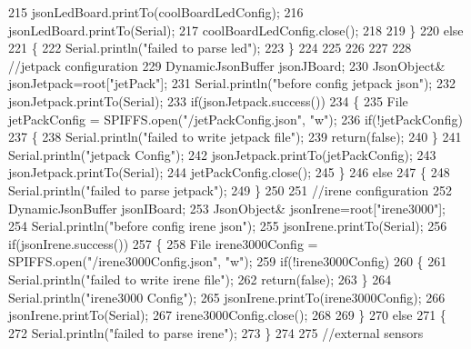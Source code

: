 \begin{DoxyCode}
215         jsonLedBoard.printTo(coolBoardLedConfig);
216         jsonLedBoard.printTo(Serial);
217         coolBoardLedConfig.close();
218     
219     \}
220     \textcolor{keywordflow}{else}
221     \{
222         Serial.println(\textcolor{stringliteral}{"failed to parse led"});
223     \}
224         
225 
226     
227 
228     \textcolor{comment}{//jetpack configuration}
229     DynamicJsonBuffer jsonJBoard;
230         JsonObject& jsonJetpack=root[\textcolor{stringliteral}{"jetPack"}];
231     Serial.println(\textcolor{stringliteral}{"before config jetpack json"});
232     jsonJetpack.printTo(Serial);
233     \textcolor{keywordflow}{if}(jsonJetpack.success())
234     \{   
235         File jetPackConfig = SPIFFS.open(\textcolor{stringliteral}{"/jetPackConfig.json"}, \textcolor{stringliteral}{"w"});   
236         \textcolor{keywordflow}{if}(!jetPackConfig)
237         \{
238             Serial.println(\textcolor{stringliteral}{"failed to write jetpack file"});
239             \textcolor{keywordflow}{return}(\textcolor{keyword}{false});
240         \}
241         Serial.println(\textcolor{stringliteral}{"jetpack Config"});   
242         jsonJetpack.printTo(jetPackConfig);
243         jsonJetpack.printTo(Serial);
244         jetPackConfig.close();
245     \}
246     \textcolor{keywordflow}{else}
247     \{
248         Serial.println(\textcolor{stringliteral}{"failed to parse jetpack"});  
249     \}
250     
251     \textcolor{comment}{//irene configuration   }
252     DynamicJsonBuffer jsonIBoard;
253         JsonObject& jsonIrene=root[\textcolor{stringliteral}{"irene3000"}];
254     Serial.println(\textcolor{stringliteral}{"before config irene json"}); 
255     jsonIrene.printTo(Serial);
256     \textcolor{keywordflow}{if}(jsonIrene.success())
257     \{
258         File irene3000Config = SPIFFS.open(\textcolor{stringliteral}{"/irene3000Config.json"}, \textcolor{stringliteral}{"w"});   
259         \textcolor{keywordflow}{if}(!irene3000Config)
260         \{
261             Serial.println(\textcolor{stringliteral}{"failed to write irene file"});
262             \textcolor{keywordflow}{return}(\textcolor{keyword}{false});
263         \}
264         Serial.println(\textcolor{stringliteral}{"irene3000 Config"});
265         jsonIrene.printTo(irene3000Config);
266         jsonIrene.printTo(Serial);
267         irene3000Config.close();
268     
269     \}
270     \textcolor{keywordflow}{else}
271     \{
272         Serial.println(\textcolor{stringliteral}{"failed to parse irene"});    
273     \}
274     
275     \textcolor{comment}{//external sensors}

\end{DoxyCode}
